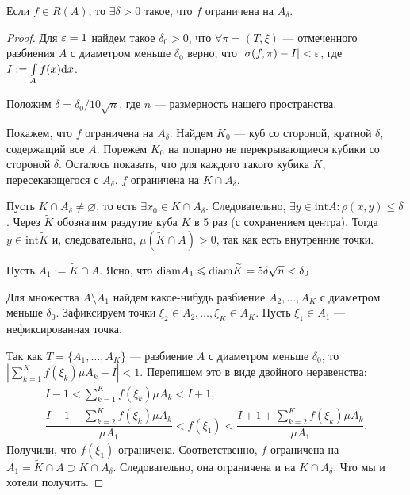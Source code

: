 \begin{Statement}
Если $f \in R(A)$, то $\exists \delta > 0$ такое, что $f$ ограничена на $A_\delta$.
\end{Statement}
\begin{proof}
Для $\varepsilon = 1$ найдем такое $\delta_0 > 0$, что $\forall \pi = (T, \xi)$ --- отмеченного разбиения $A$ с диаметром меньше $\delta_0$ верно, что $|\sigma(f, \pi) - I | < \varepsilon$, где $I := \int\limits_A f(x) \mathrm{d} x$.

Положим $\delta = \delta_0 / 10\sqrt{n}$, где $n$ --- размерность нашего пространства.

Покажем, что $f$ ограничена на $A_\delta$. Найдем $K_0$ --- куб со стороной, кратной $\delta$, содержащий все $A$. Порежем $K_0$ на попарно не перекрывающиеся кубики со стороной $\delta$. Осталось показать, что для каждого такого кубика $K$, пересекающегося с $A_\delta$, $f$ ограничена на $K \cap A_\delta$.

Пусть $K \cap A_\delta \neq \varnothing$, то есть $\exists x_0 \in K \cap A_\delta$. Следовательно, $\exists y \in \mathrm{int}A: \rho(x, y) \leq \delta$. Через $\widetilde{K}$ обозначим раздутие куба $K$ в 5 раз (с сохранением центра). Тогда $y \in \mathrm{int}\widetilde{K}$ и, следовательно, $\mu(\widetilde{K} \cap A) > 0$, так как есть внутренние точки.

Пусть $A_1 := \widetilde{K} \cap A$. Ясно, что $\mathrm{diam} A_1 \leqslant \mathrm{diam} \widetilde{K} = 5\delta \sqrt{n} < \delta_0$.

Для множества $A \setminus A_1$ найдем какое-нибудь разбиение $A_2, \ldots, A_K$ с диаметром меньше $\delta_0$. Зафиксируем точки $\xi_2 \in A_2, \ldots, \xi_K \in A_K$. Пусть $\xi_1 \in A_1$ --- нефиксированная точка.

Так как $T = \{ A_1, \ldots, A_K \}$ --- разбиение $A$ с диаметром меньше $\delta_0$, то $\left| \sum\limits_{k=1}^K f(\xi_k)\mu A_k - I\right| < 1$. Перепишем это в виде двойного неравенства:
\begin{gather*}
I - 1 < \sum\limits^K_{k=1} f(\xi_k)\mu A_k < I + 1,\\
\dfrac{I - 1 - \sum\limits_{k = 2}^Kf(\xi_k) \mu A_k }{\mu A_1} < f(\xi_1) < \dfrac{I + 1 + \sum\limits_{k = 2}^Kf(\xi_k) \mu A_k }{\mu A_1}.
\end{gather*}
Получили, что $f(\xi_1)$ ограничена. Соответственно, $f$ ограничена на $A_1 = \widetilde{K} \cap A  \supset K \cap A_\delta$. Следовательно, она ограничена и на $K \cap A_\delta$. Что мы и хотели получить. 
\end{proof}


